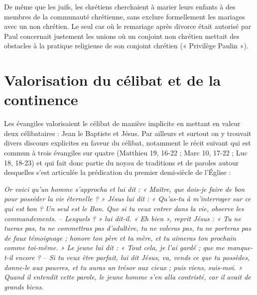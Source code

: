  De même que les juifs, les chrétiens cherchaient à marier leurs enfants à des membres de la communauté chrétienne, sans exclure formellement les mariages avec un non chrétien. Le seul cas où le remariage après divorce était autorisé par Paul concernait justement les unions où un conjoint non chrétien mettait des obstacles à la pratique religieuse de son conjoint chrétien (« Privilège Paulin »).


\section{Valorisation du célibat et de la continence}

 Les évangiles valorisaient le célibat de manière implicite en mettant en valeur deux célibataires : Jean le Baptiste et Jésus. Par ailleurs et surtout on y trouvait divers discours explicites en faveur du célibat, notamment le récit suivant qui est commun à trois évangiles sur quatre (Matthieu 19, 16-22 ; Marc 10, 17-22 ; Luc 18, 18-23) et qui fait donc partie du noyau de traditions et de paroles autour desquelles s'est articulée la prédication du premier demi-siècle de l'Église :

\begin{displayquote}[Mt~19,~16-22]
\emph{Or voici qu'un homme s'approcha et lui dit : « Maître, que dois-je faire de bon pour posséder la vie éternelle ? » Jésus lui dit : « Qu'as-tu à m'interroger sur ce qui est bon ? Un seul est le Bon. Que si tu veux entrer dans la vie, observe les commandements. -- Lesquels ? » lui dit-il. « Eh bien », reprit Jésus : « Tu ne tueras pas, tu ne commettras pas d'adultère, tu ne voleras pas, tu ne porteras pas de faux témoignage ; honore ton père et ta mère, et tu aimeras ton prochain comme toi-même. » Le jeune lui dit : « Tout cela, je l'ai gardé ; que me manque-t-il encore ? -- Si tu veux être parfait, lui dit Jésus, va, vends ce que tu possèdes, donne-le aux pauvres, et tu auras un trésor aux cieux ; puis viens, suis-moi. » Quand il entendit cette parole, le jeune homme s'en alla contristé, car il avait de grands biens.}
\end{displayquote}

